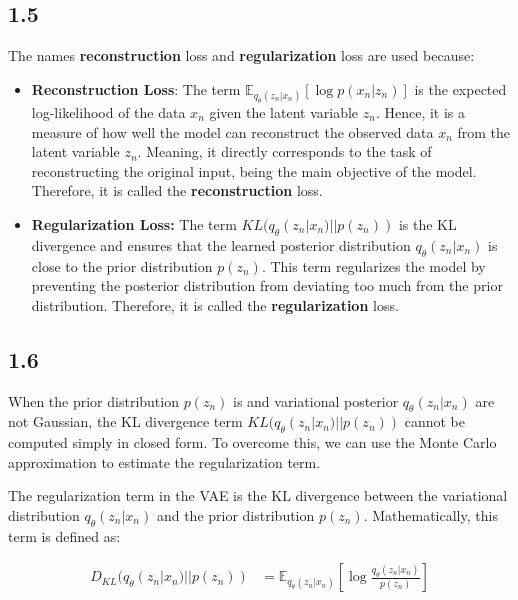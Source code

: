 \documentclass{article}
\begin{document}
\subsection*{1.5}

The names \textbf{reconstruction} loss and \textbf{regularization} loss are used because: 

\begin{itemize}
  \item \textbf{Reconstruction Loss}: The term $\mathbb{E}_{q_{\theta}(z_n|x_n)}[\log p(x_n|z_n)]$ is the expected log-likelihood
  of the data $x_n$ given the latent variable $z_n$. Hence, it is a measure of how well the model can reconstruct the
  observed data $x_n$ from the latent variable $z_n$. Meaning, it directly corresponds to the task of reconstructing the
  original input, being the main objective of the model. Therefore, it is called the \textbf{reconstruction} loss.

  \item\textbf{Regularization Loss:} The term $KL(q_{\theta}(z_n|x_n) || p(z_n))$ is the KL divergence and ensures
that the learned posterior distribution $q_{\theta}(z_n|x_n)$ is close to the prior distribution $p(z_n)$. This term
regularizes the model by preventing the posterior distribution from deviating too much from the prior distribution.
Therefore, it is called the \textbf{regularization} loss.
\end{itemize}

\subsection*{1.6}

When the prior distribution $p(z_n)$ is and variational posterior $q_{\theta}(z_n|x_n)$ are not Gaussian, the KL divergence
term $KL(q_{\theta}(z_n|x_n) || p(z_n))$ cannot be computed simply in closed form. To overcome this, we can use the
Monte Carlo approximation to estimate the regularization term. 

The regularization term in the VAE is the KL divergence between the variational distribution $q_{\theta}(z_n|x_n)$ and the prior distribution $p(z_n)$.
Mathematically, this term is defined as:

\begin{align*}
    D_{KL}(q_{\theta}(z_n|x_n) || p(z_n)) &= \mathbb{E}_{q_{\theta}(z_n|x_n)}[\log \frac{q_{\theta}(z_n|x_n)}{p(z_n)}] \\
\end{align*}
\end{document}
